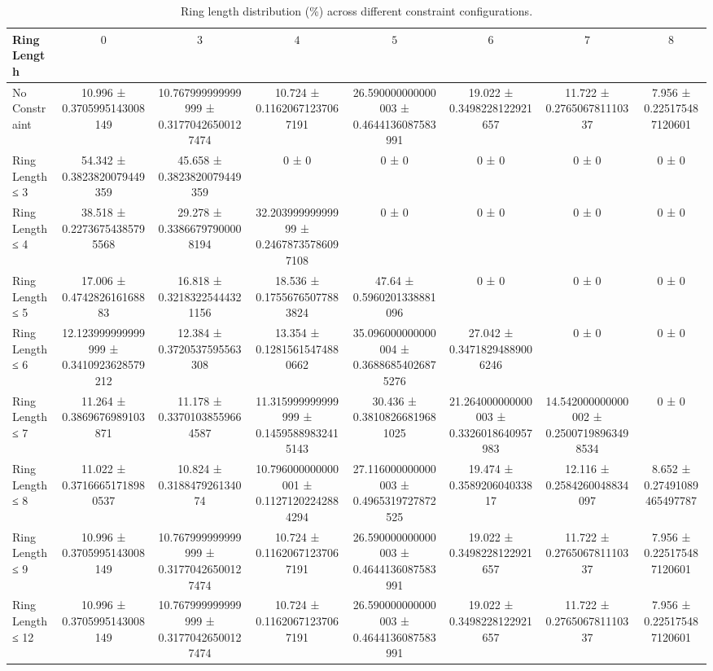 \begin{table}[H]
    \centering
    \begin{tabular}{l c c c c c c c}
        \toprule
        \textbf{Ring Length} & $0$ & $3$ & $4$ & $5$ & $6$ & $7$ & $8$ \\
        \midrule
        No Constraint & 10.996 ± 0.3705995143008149 & 10.767999999999999 ± 0.31770426500127474 & 10.724 ± 0.11620671237067191 & 26.590000000000003 ± 0.4644136087583991 & 19.022 ± 0.3498228122921657 & 11.722 ± 0.276506781110337 & 7.956 ± 0.225175487120601 \\
        Ring Length ≤ 3 & 54.342 ± 0.3823820079449359 & 45.658 ± 0.3823820079449359 & 0 ± 0 & 0 ± 0 & 0 ± 0 & 0 ± 0 & 0 ± 0 \\
        Ring Length ≤ 4 & 38.518 ± 0.22736754385795568 & 29.278 ± 0.33866797900008194 & 32.20399999999999 ± 0.24678735786097108 & 0 ± 0 & 0 ± 0 & 0 ± 0 & 0 ± 0 \\
        Ring Length ≤ 5 & 17.006 ± 0.474282616168883 & 16.818 ± 0.32183225444321156 & 18.536 ± 0.17556765077883824 & 47.64 ± 0.5960201338881096 & 0 ± 0 & 0 ± 0 & 0 ± 0 \\
        Ring Length ≤ 6 & 12.123999999999999 ± 0.3410923628579212 & 12.384 ± 0.3720537595563308 & 13.354 ± 0.12815615474880662 & 35.096000000000004 ± 0.36886854026875276 & 27.042 ± 0.34718294889006246 & 0 ± 0 & 0 ± 0 \\
        Ring Length ≤ 7 & 11.264 ± 0.3869676989103871 & 11.178 ± 0.33701038559664587 & 11.315999999999999 ± 0.14595889832415143 & 30.436 ± 0.38108266819681025 & 21.264000000000003 ± 0.3326018640957983 & 14.542000000000002 ± 0.25007198963498534 & 0 ± 0 \\
        Ring Length ≤ 8 & 11.022 ± 0.37166651718980537 & 10.824 ± 0.318847926134074 & 10.796000000000001 ± 0.11271202242884294 & 27.116000000000003 ± 0.4965319727872525 & 19.474 ± 0.358920604033817 & 12.116 ± 0.2584260048834097 & 8.652 ± 0.27491089465497787 \\
        Ring Length ≤ 9 & 10.996 ± 0.3705995143008149 & 10.767999999999999 ± 0.31770426500127474 & 10.724 ± 0.11620671237067191 & 26.590000000000003 ± 0.4644136087583991 & 19.022 ± 0.3498228122921657 & 11.722 ± 0.276506781110337 & 7.956 ± 0.225175487120601 \\
        Ring Length ≤ 12 & 10.996 ± 0.3705995143008149 & 10.767999999999999 ± 0.31770426500127474 & 10.724 ± 0.11620671237067191 & 26.590000000000003 ± 0.4644136087583991 & 19.022 ± 0.3498228122921657 & 11.722 ± 0.276506781110337 & 7.956 ± 0.225175487120601 \\
        \bottomrule
    \end{tabular}
    \caption{Ring length distribution (\%) across different constraint configurations.}
\end{table}